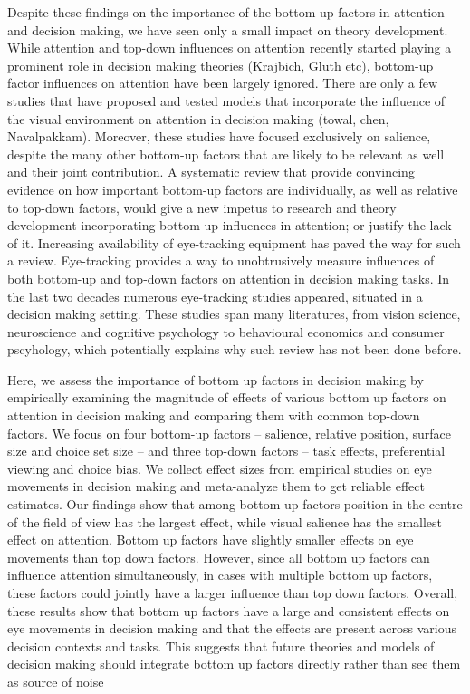 \documentclass{article}
\begin{document}
Despite these findings on the importance of the bottom-up factors in attention and decision making, we have seen only a small impact on theory development. While attention and top-down influences on attention recently started playing a prominent role in decision making theories (Krajbich, Gluth etc), bottom-up factor influences on attention have been largely ignored. There are only a few studies that have proposed and tested models that incorporate the influence of the visual environment on attention in decision making (towal, chen, Navalpakkam). Moreover, these studies have focused exclusively on salience, despite the many other bottom-up factors that are likely to be relevant as well and their joint contribution. A systematic review that provide convincing evidence on how important bottom-up factors are individually, as well as relative to top-down factors, would give a new impetus to research and theory development incorporating bottom-up influences in attention; or justify the lack of it. Increasing availability of eye-tracking equipment has paved the way for such a review. Eye-tracking provides a way to unobtrusively measure influences of both bottom-up and top-down factors on attention in decision making tasks. In the last two decades numerous eye-tracking studies appeared, situated in a decision making setting. These studies span many literatures, from vision science, neuroscience and cognitive psychology to behavioural economics and consumer pscyhology, which potentially explains why such review has not been done before.



Here, we assess the importance of bottom up factors in decision making by empirically examining the magnitude of effects of various bottom up factors on attention in decision making and comparing them with common top-down factors. We focus on four bottom-up factors – salience, relative position, surface size and choice set size – and three top-down factors – task effects, preferential viewing and choice bias. We collect effect sizes from empirical studies on eye movements in decision making and meta-analyze them to get reliable effect estimates. Our findings show that among bottom up factors position in the centre of the field of view has the largest effect, while visual salience has the smallest effect on attention. Bottom up factors have slightly smaller effects on eye movements than top down factors.  However, since all bottom up factors can influence attention simultaneously, in cases with multiple bottom up factors, these factors could jointly have a larger influence than top down factors. Overall, these results show that bottom up factors have a large and consistent effects on eye movements in decision making and that the effects are present across various decision contexts and tasks. This suggests that future theories and models of decision making should integrate bottom up factors directly rather than see them as source of noise
\end{document}
